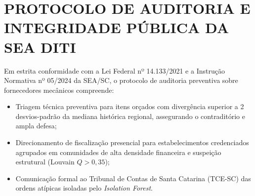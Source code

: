 \chapter{PROTOCOLO DE AUDITORIA E INTEGRIDADE PÚBLICA DA SEA DITI}
\label{apendice:b}

Em estrita conformidade com a Lei Federal nº 14.133/2021 e a Instrução Normativa nº 05/2024 da SEA/SC, o protocolo de auditoria preventiva sobre fornecedores mecânicos compreende:
\begin{itemize}
    \item Triagem técnica preventiva para itens orçados com divergência superior a 2 desvios-padrão da mediana histórica regional, assegurando o contraditório e ampla defesa;
    \item Direcionamento de fiscalização presencial para estabelecimentos credenciados agrupados em comunidades de alta densidade financeira e suspeição estrutural (Louvain $Q > 0,35$);
    \item Comunicação formal ao Tribunal de Contas de Santa Catarina (TCE-SC) das ordens atípicas isoladas pelo \textit{Isolation Forest}.
\end{itemize}
